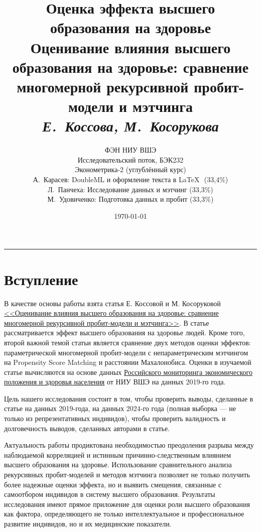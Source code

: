 \documentclass[a4paper,12pt]{article}
\title{%
    {\LARGE\bfseries Оценка эффекта высшего образования на здоровье}\\[0.6em]
    {\normalsize Оценивание влияния высшего образования на здоровье:
    сравнение многомерной рекурсивной пробит-модели и мэтчинга}\\[0.3em]
    {\small\itshape Е.~Коссова, М.~Косорукова}%
}
\author{%
    ФЭН НИУ ВШЭ \\
    Исследовательский поток, БЭК232 \\
    Эконометрика-2 (углублённый курс) \\[4pt]
    А.~Карасев: DoubleML и оформление текста в \LaTeX $\text{ }$(33,4\%) \\ 
    Л.~Панчеха: Исследование данных и мэтчинг (33,3\%)\\
    М.~Удовиченко: Подготовка данных и пробит (33,3\%)%
}
\date{\today}
\begin{document}
\maketitle

\vspace{1em}
\noindent\rule{\textwidth}{0.4pt}

\newpage

\section{Вступление}

В качестве основы работы взята статья Е. Коссовой и М. Косоруковой \href{https://ideas.repec.org/a/ris/apltrx/0465.html}{<<Оценивание влияния высшего образования на здоровье: сравнение многомерной рекурсивной пробит-модели и мэтчинга>>}.
В статье рассматривается эффект высшего образования на здоровье людей.
Кроме того, второй важной темой статьи является сравнение двух методов оценки эффектов: параметрической многомерной пробит-модели с непараметрическим мэтчингом на Propensity Score Matching и расстоянии Махалонобиса.
Оценки в изучаемой статье вычисляются на основе данных \href{https://www.hse.ru/rlms/}{Российского мониторинга экономического положения и здоровья населения} от НИУ ВШЭ на данных 2019-го года.

Цель нашего исследования состоит в том, чтобы проверить выводы, сделанные в статье на данных 2019-года, на данных 2024-го года (полная выборка --- не только из репрезентативных индивидов),
чтобы проверить валидность и долговечность выводов, сделанных авторами в статье.

Актуальность работы продиктована необходимостью преодоления разрыва между наблюдаемой корреляцией и истинным причинно-следственным влиянием высшего образования на здоровье. Использование сравнительного анализа рекурсивных пробит-моделей и методов мэтчинга позволяет не только получить более надежные оценки эффекта, но и выявить смещения, связанные с самоотбором индивидов в систему высшего образования. Результаты исследования имеют прямое приложение для оценки роли высшего образования как фактора, определяющего не только интеллектуальное и профессиональное развитие индивидов, но и их медицинские показатели.
\end{document}
